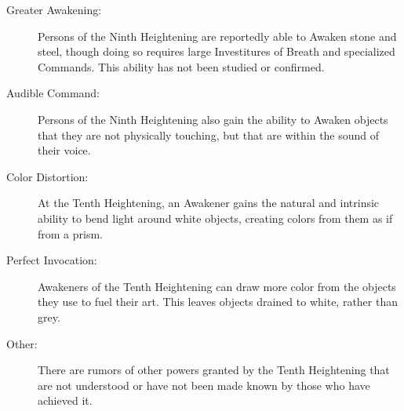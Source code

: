 \begin{description}
	\item[Greater Awakening:]
	Persons of the Ninth Heightening are reportedly able to Awaken stone and steel, though doing so requires large Investitures of Breath and specialized Commands. This ability has not been studied or confirmed.

	\item[Audible Command:]
	Persons of the Ninth Heightening also gain the ability to Awaken objects that they are not physically touching, but that are within the sound of their voice.

	\item[Color Distortion:]
	At the Tenth Heightening, an Awakener gains the natural and intrinsic ability to bend light around white objects, creating colors from them as if from a prism.

	\item[Perfect Invocation:]
	Awakeners of the Tenth Heightening can draw more color from the objects they use to fuel their art. This leaves objects drained to white, rather than grey.

	\item[Other:]
	There are rumors of other powers granted by the Tenth Heightening that are not understood or have not been made known by those who have achieved it.

\end{description}

